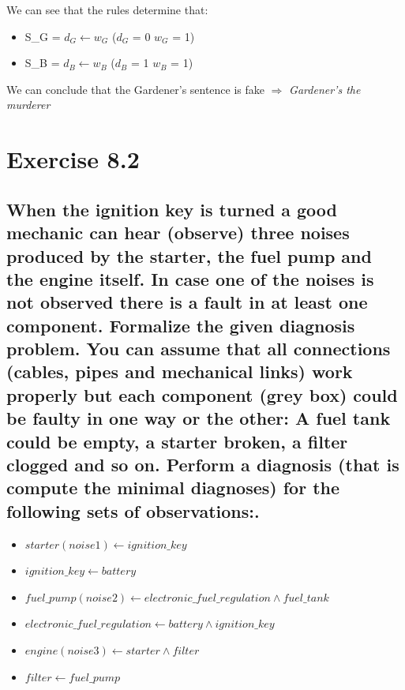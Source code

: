 \documentclass[paper=a4, fontsize=11pt]{scrartcl} %
\numberwithin{equation}{section} %
\numberwithin{figure}{section} %
\numberwithin{table}{section} %
\begin{document}
We can see that the rules determine that:

\begin{itemize}
\item S\_G  	= $d_G \leftarrow w_G$ \hspace{4cm} ($d_G$ = 0 $w_G$ = 1)
\item S\_B 	= $d_B \leftarrow w_B$ \hspace{4cm} ($d_B$ = 1 $w_B$ = 1)\\

\end{itemize}
We can conclude that the Gardener's sentence is fake $\Rightarrow$ \textit{Gardener's the murderer}


\newpage

\section*{Exercise 8.2}
\subsection*{When the ignition key is turned a good mechanic can hear (observe) three noises produced by the starter, the fuel pump and the engine itself. In case one of the noises is not observed there is a fault in at least one component. Formalize the given diagnosis problem. You can assume that all connections (cables, pipes and mechanical links) work properly but each component (grey box) could be faulty in one way or the other: A fuel tank could be empty, a starter broken, a filter clogged and so on. Perform a diagnosis (that is compute the minimal diagnoses) for the following sets of observations:. }


\begin{itemize}

	\item $ starter(noise1) \leftarrow ignition\_key $
	\item $ ignition\_key \leftarrow battery $
	
	\item $ fuel\_pump(noise2) \leftarrow electronic\_fuel\_regulation \land fuel\_tank $					
	\item $ electronic\_fuel\_regulation \leftarrow battery \land ignition\_key $
			

	\item $ engine(noise3) \leftarrow starter \land filter $
	\item $ filter \leftarrow fuel\_pump $
	
\end{itemize}
\end{document}
